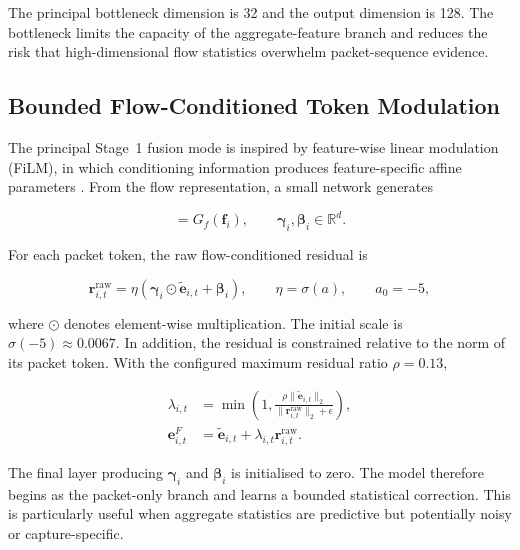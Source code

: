 \documentclass[11pt,fleqn]{report}
\begin{document}
The principal bottleneck dimension is 32 and the output dimension is 128. The bottleneck limits the capacity of the aggregate-feature branch and reduces the risk that high-dimensional flow statistics overwhelm packet-sequence evidence.

\subsection{Bounded Flow-Conditioned Token Modulation}
\label{subsubsec:token_film}

The principal Stage~1 fusion mode is inspired by feature-wise linear modulation (FiLM), in which conditioning information produces feature-specific affine parameters \cite{Perez2018FiLM}. From the flow representation, a small network generates

\begin{equation}
    [\boldsymbol{\gamma}_i;\boldsymbol{\beta}_i]
    =G_f(\mathbf{f}_i),
    \qquad
    \boldsymbol{\gamma}_i,\boldsymbol{\beta}_i\in\mathbb{R}^{d}.
    \label{eq:film_parameters}
\end{equation}

For each packet token, the raw flow-conditioned residual is

\begin{equation}
    \mathbf{r}^{\mathrm{raw}}_{i,t}
    =\eta
    \left(
        \boldsymbol{\gamma}_i\odot\widetilde{\mathbf{e}}_{i,t}
        +\boldsymbol{\beta}_i
    \right),
    \qquad
    \eta=\sigma(a),\qquad a_{0}=-5,
    \label{eq:film_raw_residual}
\end{equation}

where $\odot$ denotes element-wise multiplication. The initial scale is $\sigma(-5)\approx0.0067$. In addition, the residual is constrained relative to the norm of its packet token. With the configured maximum residual ratio $\rho=0.13$,

\begin{align}
    \lambda_{i,t}
    &=\min\left(
        1,
        \frac{\rho\|\widetilde{\mathbf{e}}_{i,t}\|_2}
             {\|\mathbf{r}^{\mathrm{raw}}_{i,t}\|_2+\epsilon}
      \right),\\
    \mathbf{e}^{F}_{i,t}
    &=\widetilde{\mathbf{e}}_{i,t}
      +\lambda_{i,t}\mathbf{r}^{\mathrm{raw}}_{i,t}.
    \label{eq:bounded_token_film}
\end{align}

The final layer producing $\boldsymbol{\gamma}_i$ and $\boldsymbol{\beta}_i$ is initialised to zero. The model therefore begins as the packet-only branch and learns a bounded statistical correction. This is particularly useful when aggregate statistics are predictive but potentially noisy or capture-specific.
\end{document}
